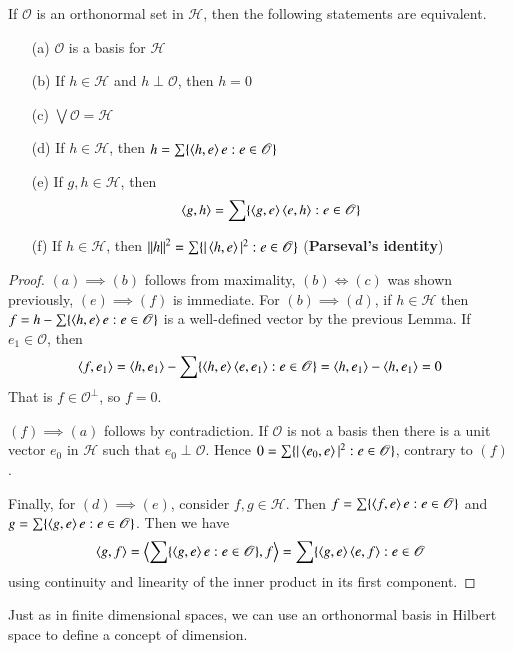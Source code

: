 \begin{thm}
    If $\mathscr{O}$ is an orthonormal set in $\mathscr{H}$, then the following statements are equivalent. \begin{enumerate}
        \item[(a)] $\mathscr{O}$ is a basis for $\mathscr{H}$
        \item[(b)] If $h \in \mathscr{H}$ and $h \perp \mathscr{O}$, then $h = 0$
        \item[(c)] $\bigvee \mathscr{O} = \mathscr{H}$
        \item[(d)] If $h \in \mathscr{H}$, then $h = \sum\{\left\langle h, e\right\rangle e:e \in \mathscr{O}\}$
        \item[(e)] If $g,h \in \mathscr{H}$, then $$\left\langle g, h\right\rangle = \sum\{\left\langle g, e\right\rangle\left\langle e, h\right\rangle:e \in \mathscr{O}\}$$
        \item[(f)] If $h \in \mathscr{H}$, then $\left|\left| h\right|\right|^2 = \sum\{|\left\langle h, e\right\rangle|^2:e \in \mathscr{O}\}$ (\textbf{Parseval's identity})
    \end{enumerate}
\end{thm}
\begin{proof}
    $(a)\implies (b)$ follows from maximality, $(b)\iff (c)$ was shown previously, $(e)\implies (f)$ is immediate. For $(b) \implies (d)$, if $h \in \mathscr{H}$ then $f = h -\sum\{\left\langle h, e\right\rangle e:e \in \mathscr{O}\}$ is a well-defined vector by the previous Lemma. If $e_1 \in \mathscr{O}$, then $$\left\langle f, e_1\right\rangle = \left\langle h, e_1\right\rangle - \sum\{\left\langle h, e\right\rangle\left\langle e, e_1\right\rangle:e \in \mathscr{O}\} = \left\langle h, e_1\right\rangle-\left\langle h, e_1\right\rangle = 0$$
    That is $f \in \mathscr{O}^{\perp}$, so $f = 0$.

    $(f)\implies (a)$ follows by contradiction. If $\mathscr{O}$ is not a basis then there is a unit vector $e_0$ in $\mathscr{H}$ such that $e_0\perp \mathscr{O}$. Hence $0 = \sum\{|\left\langle e_0, e\right\rangle|^2:e \in \mathscr{O}\}$, contrary to $(f)$.

    Finally, for $(d)\implies (e)$, consider $f,g \in \mathscr{H}$. Then $f = \sum\{\left\langle f, e\right\rangle e: e \in \mathscr{O}\}$ and $g = \sum\{\left\langle g, e\right\rangle e:e \in \mathscr{O}\}$. Then we have $$\left\langle g, f\right\rangle = \left\langle \sum\{\left\langle g, e\right\rangle e: e \in \mathscr{O}\}, f\right\rangle = \sum\{\left\langle g, e\right\rangle\left\langle e, f\right\rangle:e \in \mathscr{O}$$
    using continuity and linearity of the inner product in its first component.
\end{proof}


Just as in finite dimensional spaces, we can use an orthonormal basis in Hilbert space to define a concept of dimension.

